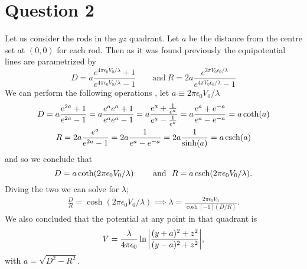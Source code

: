 \documentclass[
	12pt,
	]{article}
\newcommand{\ep}{\epsilon}
\theoremstyle{definition}
\theoremstyle{definition}
\theoremstyle{definition}
\theoremstyle{definition}
\theoremstyle{definition}
\theoremstyle{example}
\theoremstyle{note}
\theoremstyle{remark}
\theoremstyle{example}
\begin{document}
		\section*{Question 2}
			Let us consider the rods in the $yz$ quadrant. Let $a$ be the distance from the centre set at $(0,0)$ for each rod. Then as it was found previously the equipotential lines are parametrized by 
			$$ D= a\frac{e^{4 \pi \ep_{0} V_{0} / \lambda} +1}{e^{4 \pi \ep_{0} V_{0} / \lambda} -1} \qquad \text{and} \  R = 2a \frac{e^{2 \pi V_{0} \epsilon_{0} / \lambda}}{e^{4 \pi V_{0 } \epsilon_{0} / \lambda} -1 }$$
			We can perform the following operations , let $a \equiv 2 \pi \epsilon_{0} V_{0} / \lambda $
			\begin{gather*}
			D= a\frac{e^{2a} +1}{e^{2a} -1} = a\frac{e^{a}e^{a} +1}{e^{a}e^{a} -1} = a\frac{e^{a} +\frac{1}{e^{a}}}{e^{a} - \frac{1}{e^{a}}} = a\frac{e^{a} +e^{-a}}{e^{a} - e^{-a}} = a\coth(a) \\
			R = 2a \frac{e^{a}}{e^{2a} -1} = 2a \frac{1}{e^{a} - e^{-a}} =2a\frac{1}{\sinh(a)} = a \csch(a)
			\end{gather*}
			and so we conclude that 
			$$ D = a \coth(2 \pi \epsilon_{0} V_{0} / \lambda ) \qquad \text{ and } \ R = a \csch(2 \pi \epsilon_{0} V_{0} / \lambda ).$$
			Diving the two we can solve for $\lambda$; 
			\begin{align*}
			\frac{D}{R} = \cosh(2 \pi \epsilon_{0}V_{0} / \lambda) \implies \lambda  = \frac{2 \pi \epsilon_{0} V_{0}}{\cosh[-1](D/R)}.
			\end{align*}
			We also concluded that the potential at any point in that quadrant is
			$$V = \frac{\lambda}{4 \pi \epsilon_{0}} \ln \abs{\frac{(y+a)^{2} +z^{2}}{(y-a)^{2} +z^{2}}},$$
			with $a = \sqrt{D^{2} -R^{2}}.$
\end{document}
